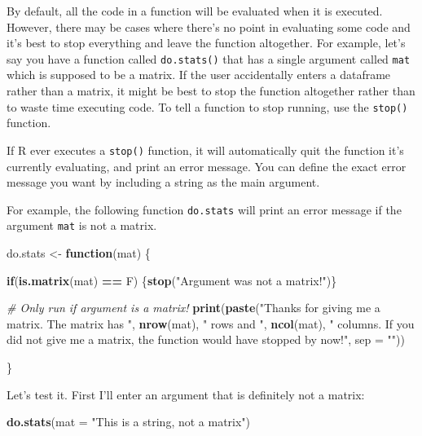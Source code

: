 \documentclass[]{book}
\newenvironment{Shaded}{\begin{snugshade}}{\end{snugshade}}
\newcommand{\KeywordTok}[1]{\textcolor[rgb]{0.13,0.29,0.53}{\textbf{#1}}}
\newcommand{\DataTypeTok}[1]{\textcolor[rgb]{0.13,0.29,0.53}{#1}}
\newcommand{\StringTok}[1]{\textcolor[rgb]{0.31,0.60,0.02}{#1}}
\newcommand{\CommentTok}[1]{\textcolor[rgb]{0.56,0.35,0.01}{\textit{#1}}}
\newcommand{\ControlFlowTok}[1]{\textcolor[rgb]{0.13,0.29,0.53}{\textbf{#1}}}
\newcommand{\OperatorTok}[1]{\textcolor[rgb]{0.81,0.36,0.00}{\textbf{#1}}}
\newcommand{\NormalTok}[1]{#1}
\theoremstyle{definition}
\theoremstyle{definition}
\theoremstyle{remark}
\begin{document}
By default, all the code in a function will be evaluated when it is
executed. However, there may be cases where there's no point in
evaluating some code and it's best to stop everything and leave the
function altogether. For example, let's say you have a function called
\texttt{do.stats()} that has a single argument called \texttt{mat} which
is supposed to be a matrix. If the user accidentally enters a dataframe
rather than a matrix, it might be best to stop the function altogether
rather than to waste time executing code. To tell a function to stop
running, use the \texttt{stop()} function.

If R ever executes a \texttt{stop()} function, it will automatically
quit the function it's currently evaluating, and print an error message.
You can define the exact error message you want by including a string as
the main argument.

For example, the following function \texttt{do.stats} will print an
error message if the argument \texttt{mat} is not a matrix.

\begin{Shaded}
\begin{Highlighting}[]
\NormalTok{do.stats <-}\StringTok{ }\ControlFlowTok{function}\NormalTok{(mat) \{}
  
\ControlFlowTok{if}\NormalTok{(}\KeywordTok{is.matrix}\NormalTok{(mat) }\OperatorTok{==}\StringTok{ }\NormalTok{F) \{}\KeywordTok{stop}\NormalTok{(}\StringTok{"Argument was not a matrix!"}\NormalTok{)\}}

\CommentTok{# Only run if argument is a matrix!}
\KeywordTok{print}\NormalTok{(}\KeywordTok{paste}\NormalTok{(}\StringTok{"Thanks for giving me a matrix. The matrix has "}\NormalTok{, }\KeywordTok{nrow}\NormalTok{(mat), }
\StringTok{" rows and "}\NormalTok{, }\KeywordTok{ncol}\NormalTok{(mat), }
\StringTok{" columns. If you did not give me a matrix, the function would have stopped by now!"}\NormalTok{, }
\DataTypeTok{sep =} \StringTok{""}\NormalTok{))}

\NormalTok{\}}
\end{Highlighting}
\end{Shaded}

Let's test it. First I'll enter an argument that is definitely not a
matrix:

\begin{Shaded}
\begin{Highlighting}[]
\KeywordTok{do.stats}\NormalTok{(}\DataTypeTok{mat =} \StringTok{"This is a string, not a matrix"}\NormalTok{) }
\end{Highlighting}
\end{Shaded}
\end{document}
